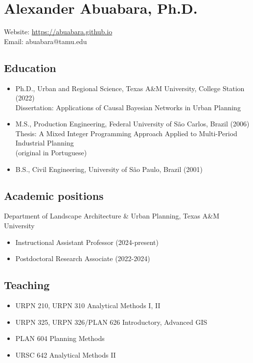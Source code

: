 \documentclass[10pt]{article}
\begin{document}
\section*{Alexander Abuabara, Ph.D.}
Website: \url{https://abuabara.github.io}\\[1.3pt]
Email: abuabara@tamu.edu

\subsection*{Education}
\begin{itemize}
\item Ph.D., Urban and Regional Science, Texas A\&M University, College Station (2022)\\[1pt]
      Dissertation: Applications of Causal Bayesian Networks in Urban Planning
\item M.S., Production Engineering, Federal University of São Carlos, Brazil (2006)\\[1pt]
      Thesis: A Mixed Integer Programming Approach Applied to Multi-Period Industrial Planning\\
      {\small (original in Portuguese)}
\item B.S., Civil Engineering, University of São Paulo, Brazil (2001)
\end{itemize}

\subsection*{Academic positions}
Department of Landscape Architecture \& Urban Planning, Texas A\&M University
\begin{itemize}
\item Instructional Assistant Professor (2024-present)
\item Postdoctoral Research Associate (2022-2024)
\end{itemize}

\subsection*{Teaching}
\begin{itemize}
\item URPN 210, URPN 310 Analytical Methods I, II
\item URPN 325, URPN 326/PLAN 626 Introductory, Advanced GIS
\item PLAN 604 Planning Methods
\item URSC 642 Analytical Methods II
\end{itemize}
\end{document}
